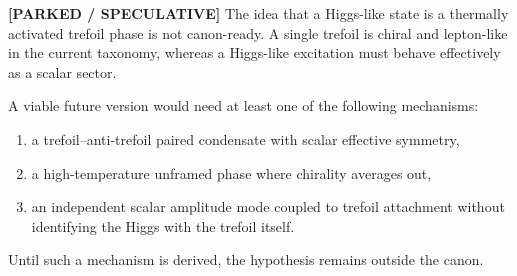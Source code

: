\textbf{[PARKED / SPECULATIVE]} The idea that a Higgs-like state is a thermally activated trefoil phase is not canon-ready. A single trefoil is chiral and lepton-like in the current taxonomy, whereas a Higgs-like excitation must behave effectively as a scalar sector.

A viable future version would need at least one of the following mechanisms:
\begin{enumerate}
    \item a trefoil--anti-trefoil paired condensate with scalar effective symmetry,
    \item a high-temperature unframed phase where chirality averages out,
    \item an independent scalar amplitude mode coupled to trefoil attachment without identifying the Higgs with the trefoil itself.
\end{enumerate}
Until such a mechanism is derived, the hypothesis remains outside the canon.

